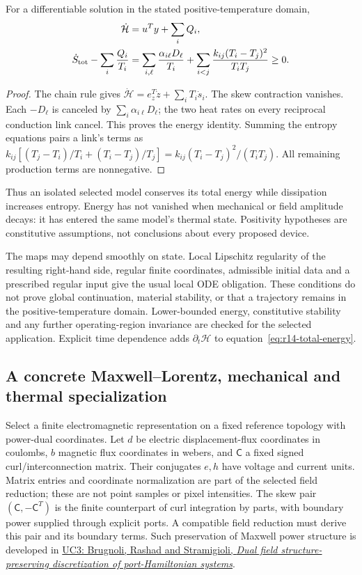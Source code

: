 \begin{proposition}
For a differentiable solution in the stated positive-temperature domain,
\begin{align}
 \dot{\mathcal H}&=u^Ty+\sum_i Q_i,\label{eq:r14-total-energy}\\
 \dot S_{\rm tot}-\sum_i\frac{Q_i}{T_i}
 &=\sum_{i,\ell}\frac{\alpha_{i\ell}D_\ell}{T_i}
   +\sum_{i<j}\frac{k_{ij}(T_i-T_j)^2}{T_iT_j}\ge0.
 \label{eq:r14-total-entropy}
\end{align}
\end{proposition}
\begin{proof}
The chain rule gives
$\dot{\mathcal H}=e_z^T\dot z+\sum_i T_i\dot s_i$.
The skew contraction vanishes. Each $-D_\ell$ is canceled by
$\sum_i\alpha_{i\ell}D_\ell$; the two heat rates on every reciprocal
conduction link cancel. This proves the energy identity. Summing the entropy
equations pairs a link's terms as
$k_{ij}[(T_j-T_i)/T_i+(T_i-T_j)/T_j]
=k_{ij}(T_i-T_j)^2/(T_iT_j)$. All remaining production terms are nonnegative.
\end{proof}
Thus an isolated selected model conserves its total energy while dissipation
increases entropy. Energy has not vanished when mechanical or field amplitude
decays: it has entered the same model's thermal state. Positivity hypotheses
are constitutive assumptions, not conclusions about every proposed device.

The maps may depend smoothly on state. Local Lipschitz regularity of the
resulting right-hand side, regular finite coordinates, admissible initial data
and a prescribed regular input give the usual local ODE obligation. These
conditions do not prove global continuation, material stability, or that a
trajectory remains in the positive-temperature domain. Lower-bounded energy,
constitutive stability and any further operating-region invariance are checked
for the selected application. Explicit time dependence adds
$\partial_t\mathcal H$ to equation~\eqref{eq:r14-total-energy}.

\subsection{A concrete Maxwell--Lorentz, mechanical and thermal specialization}
Select a finite electromagnetic representation on a fixed reference topology
with power-dual coordinates. Let $d$ be electric displacement-flux coordinates
in coulombs, $b$ magnetic flux coordinates in webers, and $\mathsf C$
a fixed signed curl/interconnection matrix. Their conjugates $e,h$ have
voltage and current units. Matrix entries and coordinate normalization are
part of the selected field reduction; these are not point samples or pixel
intensities. The skew pair $(\mathsf C,-\mathsf C^T)$ is the finite
counterpart of curl integration by parts, with boundary power supplied through
explicit ports. A compatible field reduction must derive this pair and its
boundary terms. Such preservation of Maxwell power structure is developed in
\href{https://arxiv.org/html/2202.04390v2}
{UC3: Brugnoli, Rashad and Stramigioli, \emph{Dual field structure-preserving
discretization of port-Hamiltonian systems}}.

